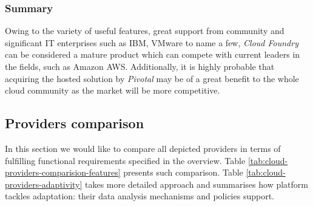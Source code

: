 \subsubsection{Summary}
Owing to the variety of useful features, great support from community and significant IT enterprises such as IBM, VMware to name a few, \emph{Cloud Foundry} can be considered a mature product which can compete with current leaders in the fields, such as Amazon AWS.
Additionally, it is highly probable that acquiring the hosted solution by \emph{Pivotal} may be of a great benefit to the whole cloud community as the market will be more competitive.

\subsection{Providers comparison}
In this section we would like to compare all depicted providers in terms of fulfilling functional requirements specified in the overview. Table \ref{tab:cloud-providers-comparision-features} presents such comparison. Table \ref{tab:cloud-providers-adaptivity} takes more detailed approach and summarises how platform tackles adaptation: their data analysis mechanisms and policies support.

